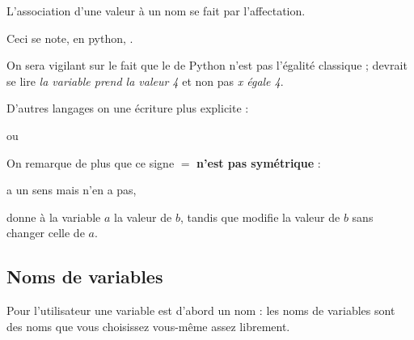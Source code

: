 L'association d'une valeur à un nom se fait par l'affectation.

\begin{minipage}[b]{0.75\textwidth}
Ceci se note, en python, .

On sera vigilant sur le fait que le \type{=} de Python n'est pas l'égalité classique ;
 devrait se lire {\it la variable  prend la valeur 4} et non pas {\it x égale 4}. 

D'autres langages on une écriture plus explicite :

 ou 

On remarque de plus que ce signe $=$ {\bf n'est pas symétrique} : 

 a un sens mais  n'en a pas,

 donne à la variable $a$ la valeur de $b$, tandis que  modifie la valeur de $b$ sans changer celle de $a$.

\end{minipage}
\hspace*{0.5cm}
\begin{minipage}[t]{0.15\textwidth}
\begin{center}
\end{center}
\end{minipage}
\subsection{Noms de variables}
Pour l'utilisateur une variable est d'abord un nom : les noms de variables sont des noms que vous choisissez vous-même assez librement. 


